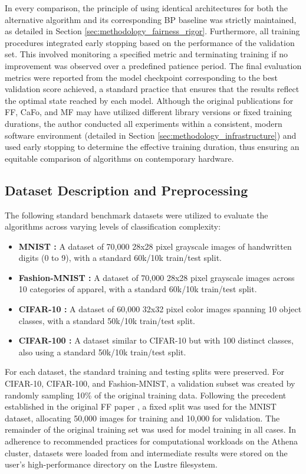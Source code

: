 In every comparison, the principle of using identical architectures for both the alternative algorithm and its corresponding BP baseline was strictly maintained, as detailed in Section \ref{sec:methodology_fairness_rigor}. Furthermore, all training procedures integrated early stopping based on the performance of the validation set. This involved monitoring a specified metric and terminating training if no improvement was observed over a predefined patience period. The final evaluation metrics were reported from the model checkpoint corresponding to the best validation score achieved, a standard practice that ensures that the results reflect the optimal state reached by each model. Although the original publications for FF, CaFo, and MF may have utilized different library versions or fixed training durations, the author conducted all experiments within a consistent, modern software environment (detailed in Section \ref{sec:methodology_infrastructure}) and used early stopping to determine the effective training duration, thus ensuring an equitable comparison of algorithms on contemporary hardware.

\subsection{Dataset Description and Preprocessing}
\label{sec:methodology_datasets}
The following standard benchmark datasets were utilized to evaluate the algorithms across varying levels of classification complexity:
\begin{itemize}
    \item \textbf{MNIST \cite{lecun1998gradient}:} A dataset of 70,000 28x28 pixel grayscale images of handwritten digits (0 to 9), with a standard 60k/10k train/test split.
    \item \textbf{Fashion-MNIST \cite{xiao2017fashion}:} A dataset of 70,000 28x28 pixel grayscale images across 10 categories of apparel, with a standard 60k/10k train/test split.
    \item \textbf{CIFAR-10 \cite{krizhevsky2012learning}:} A dataset of 60,000 32x32 pixel color images spanning 10 object classes, with a standard 50k/10k train/test split.
    \item \textbf{CIFAR-100 \cite{krizhevsky2012learning}:} A dataset similar to CIFAR-10 but with 100 distinct classes, also using a standard 50k/10k train/test split.
\end{itemize}

For each dataset, the standard training and testing splits were preserved. For CIFAR-10, CIFAR-100, and Fashion-MNIST, a validation subset was created by randomly sampling 10\% of the original training data. Following the precedent established in the original FF paper \cite{hinton2022forward}, a fixed split was used for the MNIST dataset, allocating 50,000 images for training and 10,000 for validation. The remainder of the original training set was used for model training in all cases. In adherence to recommended practices for computational workloads on the Athena cluster, datasets were loaded from and intermediate results were stored on the user's high-performance  directory on the Lustre filesystem.

